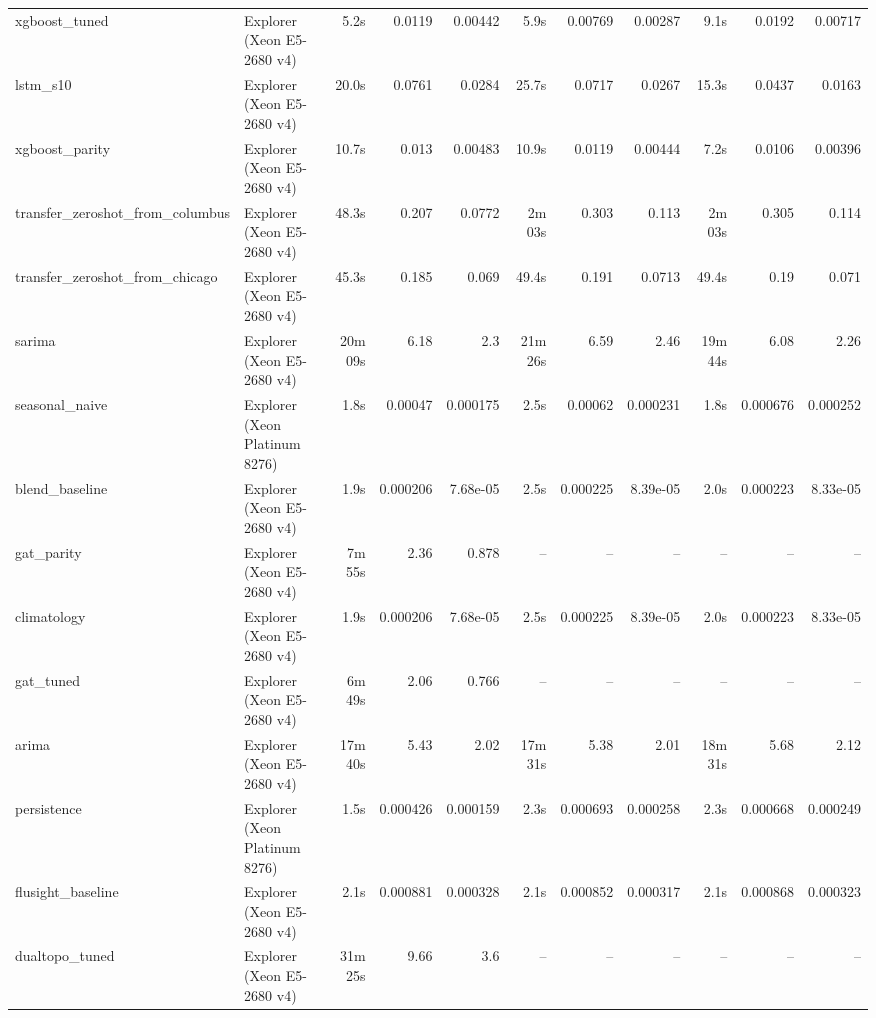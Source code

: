 \begin{tabular}{llrrrrrrrrr}
xgboost\_tuned & Explorer (Xeon E5-2680 v4) & 5.2s & 0.0119 & 0.00442 & 5.9s & 0.00769 & 0.00287 & 9.1s & 0.0192 & 0.00717 \\
lstm\_s10 & Explorer (Xeon E5-2680 v4) & 20.0s & 0.0761 & 0.0284 & 25.7s & 0.0717 & 0.0267 & 15.3s & 0.0437 & 0.0163 \\
xgboost\_parity & Explorer (Xeon E5-2680 v4) & 10.7s & 0.013 & 0.00483 & 10.9s & 0.0119 & 0.00444 & 7.2s & 0.0106 & 0.00396 \\
transfer\_zeroshot\_from\_columbus & Explorer (Xeon E5-2680 v4) & 48.3s & 0.207 & 0.0772 & 2m 03s & 0.303 & 0.113 & 2m 03s & 0.305 & 0.114 \\
transfer\_zeroshot\_from\_chicago & Explorer (Xeon E5-2680 v4) & 45.3s & 0.185 & 0.069 & 49.4s & 0.191 & 0.0713 & 49.4s & 0.19 & 0.071 \\
sarima & Explorer (Xeon E5-2680 v4) & 20m 09s & 6.18 & 2.3 & 21m 26s & 6.59 & 2.46 & 19m 44s & 6.08 & 2.26 \\
seasonal\_naive & Explorer (Xeon Platinum 8276) & 1.8s & 0.00047 & 0.000175 & 2.5s & 0.00062 & 0.000231 & 1.8s & 0.000676 & 0.000252 \\
blend\_baseline & Explorer (Xeon E5-2680 v4) & 1.9s & 0.000206 & 7.68e-05 & 2.5s & 0.000225 & 8.39e-05 & 2.0s & 0.000223 & 8.33e-05 \\
gat\_parity & Explorer (Xeon E5-2680 v4) & 7m 55s & 2.36 & 0.878 & -- & -- & -- & -- & -- & -- \\
climatology & Explorer (Xeon E5-2680 v4) & 1.9s & 0.000206 & 7.68e-05 & 2.5s & 0.000225 & 8.39e-05 & 2.0s & 0.000223 & 8.33e-05 \\
gat\_tuned & Explorer (Xeon E5-2680 v4) & 6m 49s & 2.06 & 0.766 & -- & -- & -- & -- & -- & -- \\
arima & Explorer (Xeon E5-2680 v4) & 17m 40s & 5.43 & 2.02 & 17m 31s & 5.38 & 2.01 & 18m 31s & 5.68 & 2.12 \\
persistence & Explorer (Xeon Platinum 8276) & 1.5s & 0.000426 & 0.000159 & 2.3s & 0.000693 & 0.000258 & 2.3s & 0.000668 & 0.000249 \\
flusight\_baseline & Explorer (Xeon E5-2680 v4) & 2.1s & 0.000881 & 0.000328 & 2.1s & 0.000852 & 0.000317 & 2.1s & 0.000868 & 0.000323 \\
dualtopo\_tuned & Explorer (Xeon E5-2680 v4) & 31m 25s & 9.66 & 3.6 & -- & -- & -- & -- & -- & -- \\
\bottomrule
\end{tabular}
